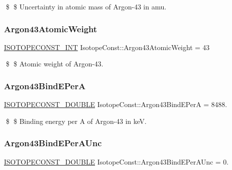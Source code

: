 \$ \$ Uncertainty in atomic mass of Argon-\/43 in amu. \mbox{\label{group___isotope_const-_argon-_ar43_ga5c31d6526bb81b93e9b87506994a016f}} 
\subsubsection{\texorpdfstring{Argon43\+Atomic\+Weight}{Argon43AtomicWeight}}
{\footnotesize\ttfamily \mbox{\hyperlink{group___isotope_const-_macros_ga5f18360b3e99483a35c32d789e62621c}{I\+S\+O\+T\+O\+P\+E\+C\+O\+N\+S\+T\+\_\+\+I\+NT}} Isotope\+Const\+::\+Argon43\+Atomic\+Weight = 43}

\$ \$ Atomic weight of Argon-\/43. \mbox{\label{group___isotope_const-_argon-_ar43_ga7ffd9733df4b15370143ac648f9e6955}} 
\subsubsection{\texorpdfstring{Argon43\+Bind\+E\+PerA}{Argon43BindEPerA}}
{\footnotesize\ttfamily \mbox{\hyperlink{group___isotope_const-_macros_ga8f45a7272ce02c0b4c65c44636ed719a}{I\+S\+O\+T\+O\+P\+E\+C\+O\+N\+S\+T\+\_\+\+D\+O\+U\+B\+LE}} Isotope\+Const\+::\+Argon43\+Bind\+E\+PerA = 8488.}

\$ \$ Binding energy per A of Argon-\/43 in keV. \mbox{\label{group___isotope_const-_argon-_ar43_ga26b04d81909a8d983ece7129d3bb67bd}} 
\subsubsection{\texorpdfstring{Argon43\+Bind\+E\+Per\+A\+Unc}{Argon43BindEPerAUnc}}
{\footnotesize\ttfamily \mbox{\hyperlink{group___isotope_const-_macros_ga8f45a7272ce02c0b4c65c44636ed719a}{I\+S\+O\+T\+O\+P\+E\+C\+O\+N\+S\+T\+\_\+\+D\+O\+U\+B\+LE}} Isotope\+Const\+::\+Argon43\+Bind\+E\+Per\+A\+Unc = 0.}

